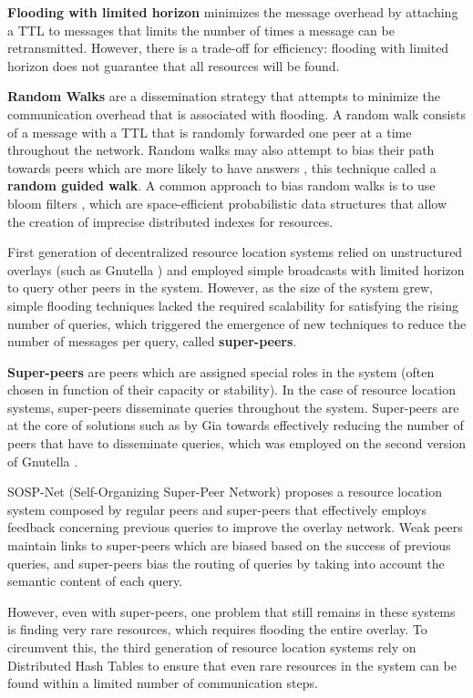 \textbf{Flooding with limited horizon} minimizes the message overhead by attaching a TTL to messages that limits the number of times a message can be retransmitted. However, there is a trade-off for efficiency: flooding with limited horizon does not guarantee that all resources will be found. 

\textbf{Random Walks} are a dissemination strategy that attempts to minimize the communication overhead that is associated with flooding. A random walk consists of a message with a TTL that is randomly forwarded one peer at a time throughout the network. Random walks may also attempt to bias their path towards peers which are more likely to have answers \cite{1022239}, this technique called a \textbf{random guided walk}. A common approach to bias random walks is to use bloom filters \cite{5751342}, which are space-efficient probabilistic data structures that allow the creation of imprecise distributed indexes for resources.

First generation of decentralized resource location systems relied on unstructured overlays (such as Gnutella \cite{gnutella_gtk}) and employed simple broadcasts with limited horizon to query other peers in the system. However, as the size of the system grew, simple flooding techniques lacked the required scalability for satisfying the rising number of queries, which triggered the emergence of new techniques to reduce the number of messages per query, called \textbf{super-peers}. 

\textbf{Super-peers} are peers which are assigned special roles in the system (often chosen in function of their capacity or stability). In the case of resource location systems, super-peers disseminate queries throughout the system. Super-peers are at the core of solutions such as by Gia \cite{Chawathe2003} towards effectively reducing the number of peers that have to disseminate queries, which was employed on the second version of Gnutella \cite{gnutella_gtk}. 

SOSP-Net \cite{garbacki2007optimizing}  (Self-Organizing Super-Peer Network) proposes a resource location system composed by regular peers and super-peers that effectively employs feedback concerning previous queries to improve the overlay network. Weak peers maintain links to super-peers which are biased based on the success of previous queries, and super-peers bias the routing of queries by taking into account the semantic content of each query. 

However, even with super-peers, one problem that still remains in these systems is finding very rare resources, which requires flooding the entire overlay. To circumvent this, the third generation of resource location systems rely on Distributed Hash Tables to ensure that even rare resources in the system can be found within a limited number of communication steps.


